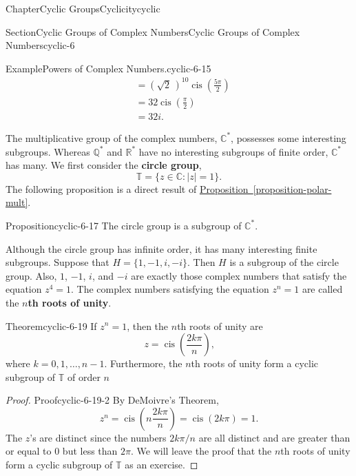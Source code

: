\documentclass[oneside,10pt,]{book}
\newcommand{\xreffont}{\relax}
\newcommand{\terminology}[1]{\textbf{#1}}
\numberwithin{equation}{section}
\newcommand{\cis}{\operatorname{cis}}
\begin{document}
\begin{chapterptx}{Chapter}{Cyclic Groups}{}{Cyclicity}{}{}{cyclic}
\begin{sectionptx}{Section}{Cyclic Groups of Complex Numbers}{}{Cyclic Groups of Complex Numbers}{}{}{cyclic-6}
\begin{example}{Example}{Powers of Complex Numbers.}{cyclic-6-15}
\begin{align*}
& = ( \sqrt{2}\, )^{10} \cis \left( \frac{5\pi }{2} \right)\\
& = 32  \cis \left( \frac{\pi }{2} \right)\\
& = 32i\text{.}
\end{align*}
%
\end{example}
The multiplicative group of the complex numbers, \({\mathbb C}^*\), possesses some interesting subgroups.  Whereas \({\mathbb Q}^*\) and \({\mathbb R}^*\) have no interesting subgroups of finite order, \({\mathbb C}^*\) has many. We first consider the \terminology{circle group},%
\begin{equation*}
{\mathbb T} = \{ z \in {\mathbb C} : |z| = 1 \}\text{.}
\end{equation*}
The following proposition is a direct result of \hyperref[proposition-polar-mult]{Proposition~{\xreffont\ref{proposition-polar-mult}}}.\label{cyclic-6-16-9}%
\begin{proposition}{Proposition}{}{}{cyclic-6-17}%
The circle group is a subgroup of  \({\mathbb C}^*\).%
\end{proposition}
Although the circle group has infinite order, it has many interesting finite subgroups. Suppose that \(H = \{ 1, -1, i, -i \}\). Then \(H\) is a subgroup of the circle group. Also, \(1\), \(-1\), \(i\), and \(-i\) are exactly those complex numbers that satisfy the equation \(z^4 = 1\). The complex numbers satisfying the equation \(z^n=1\) are called the \terminology{\(n\)th roots of unity}.%
\begin{theorem}{Theorem}{}{}{cyclic-6-19}%
If \(z^n = 1\), then the \(n\)th roots of unity are%
\begin{equation*}
z = \cis\left( \frac{2 k \pi}{n } \right)\text{,}
\end{equation*}
where \(k = 0, 1, \ldots, n-1\). Furthermore, the \(n\)th roots of unity form a cyclic subgroup of \({\mathbb T}\) of order \(n\)%
\end{theorem}
\begin{proof}{Proof}{}{cyclic-6-19-2}
By DeMoivre's Theorem,%
\begin{equation*}
z^n = \cis \left( n \frac{2 k \pi}{n } \right) = \cis( 2 k \pi ) = 1\text{.}
\end{equation*}
The \(z\)'s are distinct since the numbers \(2 k \pi /n\) are all distinct and are greater than or equal to 0 but less than \(2 \pi\).  We will leave the proof that the \(n\)th roots of unity form a cyclic subgroup of \({\mathbb T}\) as an exercise.%
\end{proof}

\end{sectionptx}
\end{chapterptx}
\end{document}
